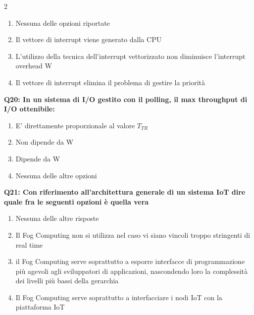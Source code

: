 \documentclass[10pt]{article}
\begin{document}
\begin{multicols}{2}
\begin{enumerate}[label=\arabic*.]
\item Nessuna delle opzioni riportate
\item Il vettore di interrupt viene generato dalla CPU
\item L’utilizzo della tecnica dell’interrupt vettorizzato non diminuisce l’interrupt overhead W
\item Il vettore di interrupt elimina il problema di gestire la priorità
\end{enumerate}
\textbf{Q20: In un sistema di I/O gestito con il polling, il max throughput di I/O ottenibile:}

\begin{enumerate}[label=\arabic*.]
\item E' direttamente proporzionale al valore $T_{TR}$
\item Non dipende da W
\item Dipende da W
\item Nessuna delle altre opzioni
\end{enumerate}
\textbf{Q21: Con riferimento all’architettura generale di un sistema IoT dire quale fra le seguenti opzioni è quella vera}

\begin{enumerate}[label=\arabic*.]
\item Nessuna delle altre risposte
\item Il Fog Computing non si utilizza nel caso vi siano vincoli troppo stringenti di real time
\item il Fog Computing serve soprattutto a esporre interfacce di programmazione più agevoli agli sviluppatori di applicazioni, nascondendo loro la complessità dei livelli più bassi della gerarchia
\item Il Fog Computing serve soprattutto a interfacciare i nodi IoT con la piattaforma IoT
\end{enumerate}
\end{multicols}
\end{document}
